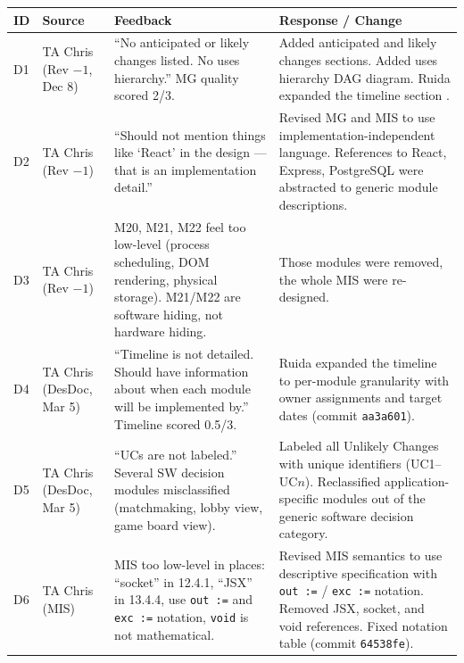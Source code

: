 \documentclass{article}
\begin{document}
\begin{longtable}{p{} p{} p{} p{}}
\toprule
\textbf{ID} & \textbf{Source} & \textbf{Feedback} & \textbf{Response / Change} \\
\midrule
\endhead
\bottomrule
\endfoot

D1 & TA Chris (Rev $-1$, Dec 8) & ``No anticipated or likely changes listed. No uses hierarchy.'' MG quality scored 2/3. & Added anticipated and likely changes sections. Added uses hierarchy DAG diagram. Ruida expanded the timeline section . \\
\midrule

D2 & TA Chris (Rev $-1$) & ``Should not mention things like `React' in the design --- that is an implementation detail.'' & Revised MG and MIS to use implementation-independent language. References to React, Express, PostgreSQL were abstracted to generic module descriptions. \\
\midrule

D3 & TA Chris (Rev $-1$) & M20, M21, M22 feel too low-level (process scheduling, DOM rendering, physical storage). M21/M22 are software hiding, not hardware hiding. & Those modules were removed, the whole MIS were re-designed. \\
\midrule



D4 & TA Chris (DesDoc, Mar 5) & ``Timeline is not detailed. Should have information about when each module will be implemented by.'' Timeline scored 0.5/3. & Ruida expanded the timeline to per-module granularity with owner assignments and target dates (commit \texttt{aa3a601}). \\
\midrule

D5 & TA Chris (DesDoc, Mar 5) & ``UCs are not labeled.'' Several SW decision modules misclassified (matchmaking, lobby view, game board view). & Labeled all Unlikely Changes with unique identifiers (UC1--UC$n$). Reclassified application-specific modules out of the generic software decision category. \\
\midrule

D6 & TA Chris (MIS) & MIS too low-level in places: ``socket'' in 12.4.1, ``JSX'' in 13.4.4, use \texttt{out :=} and \texttt{exc :=} notation, \texttt{void} is not mathematical. & Revised MIS semantics to use descriptive specification with \texttt{out :=} / \texttt{exc :=} notation. Removed JSX, socket, and void references. Fixed notation table (commit \texttt{64538fe}). \\
\midrule


\end{longtable}
\end{document}
